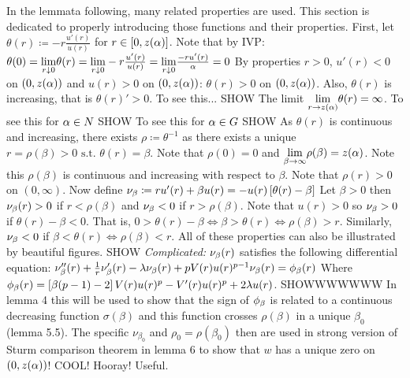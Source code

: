 \begin{outline}
  \1 In the lemmata following, many related properties are used. This section is dedicated to properly introducing those functions and their properties.
  \1 First, let $\theta(r)\coloneqq-r\frac{u'(r)}{u(r)}$ for $r\in[0,z(\alpha)]$.
    \2 Note that by IVP: $\theta(0)=\underset{r\downarrow0}{\lim}\theta(r)=\underset{r\downarrow0}{\lim}-r\frac{u'(r)}{u(r)}=\underset{r\downarrow0}{\lim}\frac{-ru'(r)}{\alpha}=0$
    \2 By properties $r>0$, $u'(r)<0$ on $(0,z(\alpha))$ and $u(r)>0$ on $(0,z(\alpha))$: $\theta(r)>0$ on $(0,z(\alpha))$.
    \2 Also, $\theta(r)$ is increasing, that is $\theta(r)'>0$.
      \3 To see this... SHOW
    \2 The limit $\underset{r\to z(\alpha)}{\lim}\theta(r)=\infty$.
      \3 To see this for $\alpha\in N$ SHOW
      \3 To see this for $\alpha\in G$ SHOW
  \1 As $\theta(r)$ is continuous and increasing, there exists $\rho\coloneqq\theta^{-1}$ as there exists a unique $r=\rho(\beta)>0\text{ s.t. } \theta(r)=\beta$.
    \2 Note that $\rho(0)=0$ and $\underset{\beta\to\infty}{\lim}\rho(\beta)=z(\alpha)$.
    \2 Note this $\rho(\beta)$ is continuous and increasing with respect to $\beta$.
    \2 Note that $\rho(r)>0$ on $(0,\infty)$.
  \1 Now define $\nu_{\beta}\coloneqq ru'(r)+\beta u(r)=-u(r)\left[\theta(r)-\beta\right]$
  \1 Let $\beta>0$ then $\nu_{\beta}(r)>0$ if $r<\rho(\beta)$ and $\nu_{\beta}<0$ if $r>\rho(\beta)$.
    \2 Note that $u(r)>0$ so $\nu_{\beta}>0$ if $\theta(r)-\beta<0$. That is, $0>\theta(r)-\beta\iff\beta>\theta(r)\iff\rho(\beta)>r$. Similarly, $\nu_{\beta}<0$ if $\beta<\theta(r)\iff\rho(\beta)<r$.
  \1 All of these properties can also be illustrated by beautiful figures. SHOW
  \1 \emph{Complicated:} $\nu_{\beta}(r)$ satisfies the following differential equation:
    \2 $\nu_{\beta}''(r)+\frac{1}{r}\nu_{\beta}'(r)-\lambda\nu_{\beta}(r)+pV(r)u(r)^{p-1}\nu_{\beta}(r)=\phi_{\beta}(r)$
    \2 Where $\phi_{\beta}(r)=\left[\beta(p-1)-2\right]V(r)u(r)^p-V'(r)u(r)^p+2\lambda u(r)$.
    \2 SHOWWWWWWW
  \1 In lemma 4 this will be used to show that the sign of $\phi_{\beta}$ is related to a continuous decreasing function $\sigma(\beta)$ and this function crosses $\rho(\beta)$ in a unique $\beta_0$ (lemma 5.5). The specific $\nu_{\beta_0}$ and $\rho_0=\rho(\beta_0)$ then are used in strong version of Sturm comparison theorem in lemma 6 to show that $w$ has a unique zero on $(0,z(\alpha))$! COOL! Hooray! Useful.
\end{outline}
